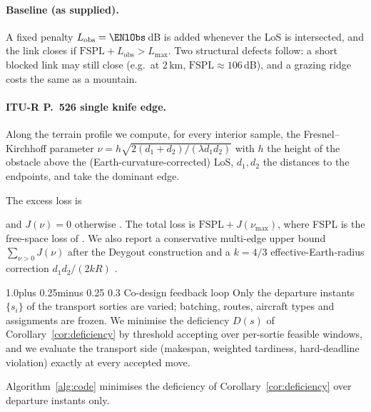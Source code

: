 \documentclass[11pt]{article}
\makeatletter
\def\subsection{\@startsection{subsection}{2}{\z@}%
    {1.0\baselineskip plus 0.25\baselineskip minus 0.25\baselineskip}%
    {0.3\baselineskip}%
    {\normalfont\normalsize\itshape}}%
\newcommand{\eqfit}[1]{%
  \par\nobreak
  \begin{center}%
  \resizebox{\ifdim\width>\linewidth\linewidth\else\width\fi}{!}{$\displaystyle #1$}%
  \end{center}%
  \par\nobreak
}
\theoremstyle{dshplain}
\theoremstyle{dshdefn}
\makeatother
\begin{document}
\paragraph{Baseline (as supplied).}
A fixed penalty $L_{\mathrm{obs}}=\ENlObs$\,dB is added whenever the LoS is
intersected, and the link closes if $\mathrm{FSPL}+L_{\mathrm{obs}}>L_{\max}$.
Two structural defects follow: a short blocked link may still close
(e.g.\ at $2$\,km, $\mathrm{FSPL}\approx 106$\,dB), and a grazing ridge costs
the same as a mountain.

\paragraph{ITU-R P.~526 single knife edge.}
{\sloppy Along the terrain profile we compute, for every interior sample, the
Fresnel--Kirchhoff parameter
$\nu=h\sqrt{2(d_1+d_2)/(\lambda d_1 d_2)}$ \cite{iturp526} with $h$ the height of
the obstacle above the (Earth-curvature-corrected) LoS, $d_1,d_2$ the distances
to the endpoints, and take the dominant edge.}\par The excess loss is
\eqfit{
J(\nu)=6.9+20\lg\!\Bigl(\sqrt{(\nu-0.1)^2+1}+\nu-0.1\Bigr)\ \mathrm{dB},
\qquad \nu>-0.78,
}
and $J(\nu)=0$ otherwise \cite{iturp526}. The total loss is
$\mathrm{FSPL}+J(\nu_{\max})$, where FSPL is the free-space loss of
\cite{friis1946}. We also report a conservative multi-edge upper bound
$\sum_{\nu>0}J(\nu)$ after the Deygout construction \cite{deygout} and a $k=4/3$
effective-Earth-radius correction $d_1d_2/(2kR)$ \cite{iturp526}.

\subsection{Co-design feedback loop}
\label{sec:feedback}
Only the departure instants $\{s_i\}$ of the transport sorties are varied;
batching, routes, aircraft types and assignments are frozen. We minimise the
deficiency $D(s)$ of Corollary~\ref{cor:deficiency} by threshold accepting over
per-sortie feasible windows, and we evaluate the transport side
(makespan, weighted tardiness, hard-deadline violation) exactly at every
accepted move.

Algorithm~\ref{alg:code} minimises the deficiency of
Corollary~\ref{cor:deficiency} over departure instants only.
\end{document}
